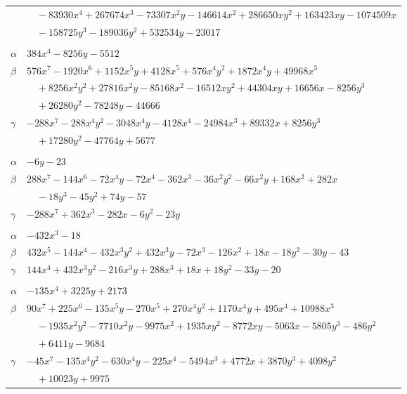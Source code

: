 \documentclass[11pt]{article}
\begin{document}
\begin{longtable}{@{}ll@{}}
 & $\quad -83930x^{4}+267674x^{3}-73307x^{2}y-146614x^{2}+286650xy^{2}+163423xy-1074509x$\\
 & $\quad -158725y^{3}-189036y^{2}+532534y-23017$\\
\addlinespace[3pt]
\multicolumn{2}{@{}l}{$\{i,j\}=\{8,14\}$, $k_{ij}=3\cdot 5\cdot 11$}\\
$\alpha$ & $384x^{4}-8256y-5512$\\
$\beta$ & $576x^{7}-1920x^{6}+1152x^{5}y+4128x^{5}+576x^{4}y^{2}+1872x^{4}y+49968x^{3}$\\
 & $\quad +8256x^{2}y^{2}+27816x^{2}y-85168x^{2}-16512xy^{2}+44304xy+16656x-8256y^{3}$\\
 & $\quad +26280y^{2}-78248y-44666$\\
$\gamma$ & $-288x^{7}-288x^{4}y^{2}-3048x^{4}y-4128x^{4}-24984x^{3}+89332x+8256y^{3}$\\
 & $\quad +17280y^{2}-47764y+5677$\\
\addlinespace[3pt]
\multicolumn{2}{@{}l}{$\{i,j\}=\{9,12\}$, $k_{ij}=2\cdot 17$}\\
$\alpha$ & $-6y-23$\\
$\beta$ & $288x^{7}-144x^{6}-72x^{4}y-72x^{4}-362x^{3}-36x^{2}y^{2}-66x^{2}y+168x^{2}+282x$\\
 & $\quad -18y^{3}-45y^{2}+74y-57$\\
$\gamma$ & $-288x^{7}+362x^{3}-282x-6y^{2}-23y$\\
\addlinespace[3pt]
\multicolumn{2}{@{}l}{$\{i,j\}=\{9,14\}$, $k_{ij}=5$}\\
$\alpha$ & $-432x^{3}-18$\\
$\beta$ & $432x^{5}-144x^{4}-432x^{3}y^{2}+432x^{3}y-72x^{3}-126x^{2}+18x-18y^{2}-30y-43$\\
$\gamma$ & $144x^{4}+432x^{3}y^{2}-216x^{3}y+288x^{3}+18x+18y^{2}-33y-20$\\
\addlinespace[3pt]
\multicolumn{2}{@{}l}{$\{i,j\}=\{10,11\}$, $k_{ij}=2^{5}\cdot 7\cdot 11$}\\
$\alpha$ & $-135x^{4}+3225y+2173$\\
$\beta$ & $90x^{7}+225x^{6}-135x^{5}y-270x^{5}+270x^{4}y^{2}+1170x^{4}y+495x^{4}+10988x^{3}$\\
 & $\quad -1935x^{2}y^{2}-7710x^{2}y-9975x^{2}+1935xy^{2}-8772xy-5063x-5805y^{3}-486y^{2}$\\
 & $\quad +6411y-9684$\\
$\gamma$ & $-45x^{7}-135x^{4}y^{2}-630x^{4}y-225x^{4}-5494x^{3}+4772x+3870y^{3}+4098y^{2}$\\
 & $\quad +10023y+9975$\\

\end{longtable}
\end{document}
